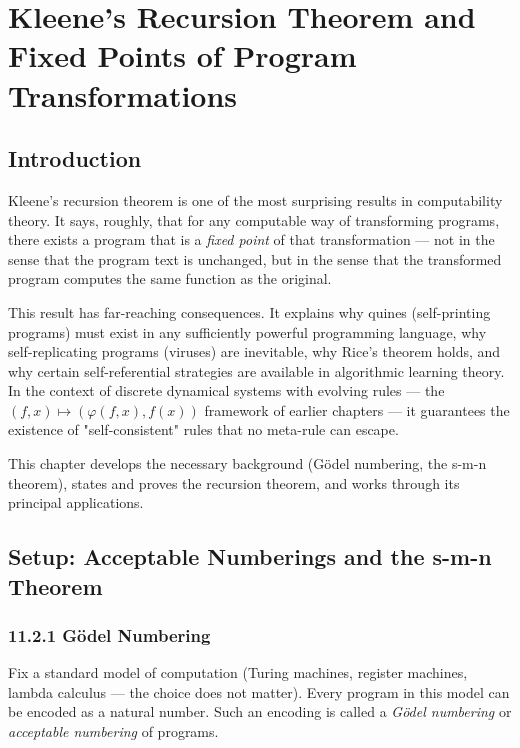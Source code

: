 \chapter{Kleene's Recursion Theorem and Fixed Points of Program Transformations}

\section{Introduction}

Kleene's recursion theorem is one of the most surprising results in computability theory. It says, roughly, that for any computable way of transforming programs, there exists a program that is a \textit{fixed point} of that transformation --- not in the sense that the program text is unchanged, but in the sense that the transformed program computes the same function as the original.

This result has far-reaching consequences. It explains why quines (self-printing programs) must exist in any sufficiently powerful programming language, why self-replicating programs (viruses) are inevitable, why Rice's theorem holds, and why certain self-referential strategies are available in algorithmic learning theory. In the context of discrete dynamical systems with evolving rules --- the $(f, x) \mapsto (\varphi(f, x), f(x))$ framework of earlier chapters --- it guarantees the existence of "self-consistent" rules that no meta-rule can escape.

This chapter develops the necessary background (Gödel numbering, the s-m-n theorem), states and proves the recursion theorem, and works through its principal applications.

\section{Setup: Acceptable Numberings and the s-m-n Theorem}

\subsection{11.2.1 Gödel Numbering}

Fix a standard model of computation (Turing machines, register machines, lambda calculus --- the choice does not matter). Every program in this model can be encoded as a natural number. Such an encoding is called a \textit{Gödel numbering} or \textit{acceptable numbering} of programs.

